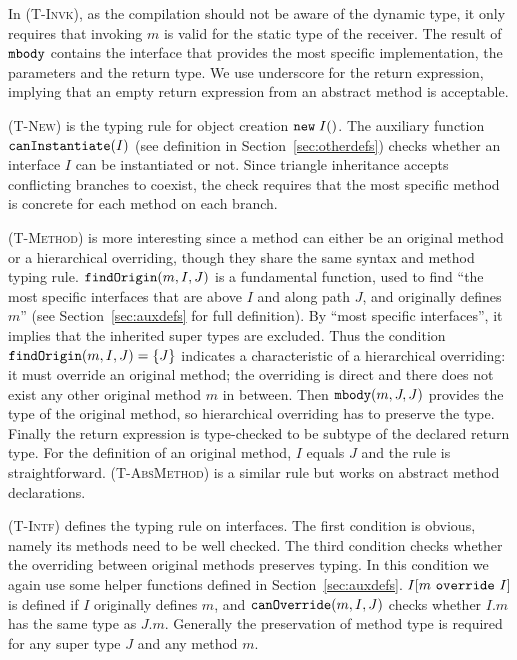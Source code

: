 In \textsc{(T-Invk)}, as the compilation should not be aware
of the dynamic type, it only requires that invoking $m$ is valid for the static type of the
receiver. The result of $\texttt{mbody}$ contains the interface that provides the most specific implementation,
the parameters and the return type. We use underscore for the return expression, implying that an empty return expression
from an abstract method is acceptable.

\textsc{(T-New)} is the typing rule for object creation $\texttt{new} \; I()$. The
auxiliary function $\texttt{canInstantiate}(I)$ (see definition in Section~\ref{sec:otherdefs}) checks whether an interface $I$ 
can be instantiated or not. Since triangle inheritance accepts conflicting branches to coexist, the check requires that the most specific method is concrete for each method on each branch.

\textsc{(T-Method)} is more interesting since a method can either be an original method or a hierarchical overriding, though
they share the same syntax and method typing rule. $\texttt{findOrigin}(m, I, J)$ is a fundamental function,
used to find ``the most specific interfaces that are above $I$ and
along path $J$, and originally defines $m$'' (see
Section~\ref{sec:auxdefs} for full definition).
By ``most specific interfaces'',
it implies that the inherited super types are excluded. Thus the condition $\texttt{findOrigin}(m, I, J) = \{J\}$ indicates a characteristic of a hierarchical overriding: it must override an original method; the overriding is direct and there does not exist any other original method $m$ in between.
Then $\texttt{mbody}(m, J, J)$ provides the type of the original method, so hierarchical overriding has to preserve the type. Finally the return expression
is type-checked to be subtype of the declared return type. For the definition of an original method, $I$ equals $J$ and the rule is straightforward. \textsc{(T-AbsMethod)} is a similar rule but works on abstract method declarations.

\textsc{(T-Intf)} defines the typing rule on interfaces. The first condition is obvious, namely its methods need to be well checked. The third
condition checks whether the overriding between original methods preserves typing. In this condition we again use some helper functions defined in  Section~\ref{sec:auxdefs}. $I[m\ \texttt{override}\ I]$ is defined if $I$ originally defines $m$, and $\texttt{canOverride}(m, I, J)$ checks whether $I.m$ has the same type as $J.m$. Generally the preservation of method type is required for any super type $J$ and any method $m$.


